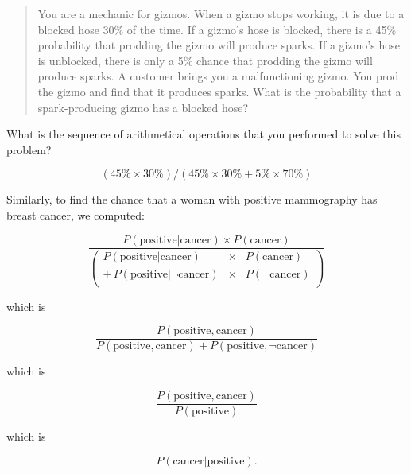 {\hr

\begin{quote}
{
 You are a mechanic for gizmos. When a gizmo stops working, it is
due to a blocked hose 30\% of the time. If a gizmo's
hose is blocked, there is a 45\% probability that prodding the gizmo
will produce sparks. If a gizmo's hose is unblocked,
there is only a 5\% chance that prodding the gizmo will produce sparks.
A customer brings you a malfunctioning gizmo. You prod the gizmo and
find that it produces sparks. What is the probability that a
spark-producing gizmo has a blocked hose?}
\end{quote}


 What is the sequence of arithmetical operations that you performed
to solve this problem?

\begin{equation*}
 (45\% \times 30\%) / (45\% \times 30\% + 5\% \times 70\%)
\end{equation*}


 Similarly, to find the chance that a woman with positive
mammography has breast cancer, we computed:

\begin{equation*}
  \frac{P(\text{positive}|\text{cancer})\times P(\text{cancer})}
       {\left(\begin{array}{rcl}
           P(\text{positive}|\text{cancer}) & \times & P(\text{cancer}) \\
           +\, P(\text{positive}|\lnot \text{cancer}) & \times & P(\lnot \text{cancer}) \\
         \end{array}
         \right)}
\end{equation*}



 which is

\begin{equation*}
  \frac{P(\text{positive},\text{cancer})}
  {P(\text{positive},\text{cancer}) + P(\text{positive},\lnot\text{cancer})}
\end{equation*}


 which is

\begin{equation*}
  \frac{P(\text{positive},\text{cancer})}{ P(\text{positive})}
\end{equation*}



 which is

\begin{equation*}
  P(\text{cancer}|\text{positive}).
\end{equation*}


}
